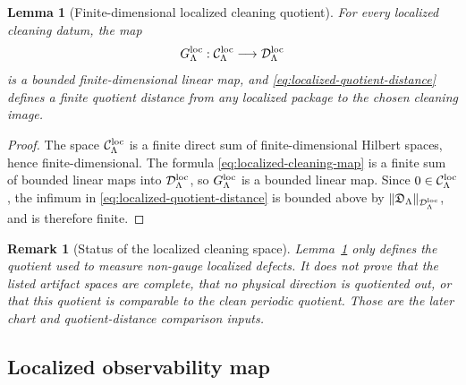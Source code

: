\documentclass[11pt]{article}
\numberwithin{equation}{section}
\newtheorem{lemma}[theorem]{Lemma}
\newtheorem{remark}[theorem]{Remark}
\begin{document}
\begin{lemma}[Finite-dimensional localized cleaning quotient]\label{lem:localized-cleaning-quotient}
For every localized cleaning datum, the map
\[
        G_\Lambda^{\rm loc}:
        \mathcal C_\Lambda^{\rm loc}
        \longrightarrow
        \mathcal D_\Lambda^{\rm loc}
\]
is a bounded finite-dimensional linear map, and
\eqref{eq:localized-quotient-distance} defines a finite quotient distance
from any localized package to the chosen cleaning image.
\end{lemma}

\begin{proof}
The space \(\mathcal C_\Lambda^{\rm loc}\) is a finite direct sum of
finite-dimensional Hilbert spaces, hence finite-dimensional.  The formula
\eqref{eq:localized-cleaning-map} is a finite sum of bounded linear maps
into \(\mathcal D_\Lambda^{\rm loc}\), so \(G_\Lambda^{\rm loc}\) is a
bounded linear map.  Since \(0\in\mathcal C_\Lambda^{\rm loc}\), the
infimum in \eqref{eq:localized-quotient-distance} is bounded above by
\(\|\mathfrak D_\Lambda\|_{\mathcal D_\Lambda^{\rm loc}}\), and is
therefore finite.
\end{proof}

\begin{remark}[Status of the localized cleaning space]
Lemma~\ref{lem:localized-cleaning-quotient} only defines the quotient used
to measure non-gauge localized defects.  It does not prove that the listed
artifact spaces are complete, that no physical direction is quotiented out,
or that this quotient is comparable to the clean periodic quotient.  Those
are the later chart and quotient-distance comparison inputs.
\end{remark}

\subsection{Localized observability map}\label{subsec:localized-observability-map}
\end{document}
